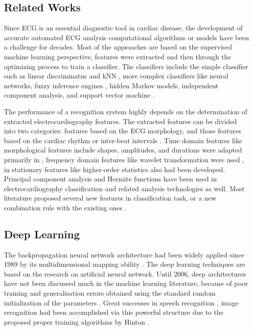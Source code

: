 \documentclass[journal]{IEEEtran}
\begin{document}
\subsection{Related Works}
Since ECG is an essential diagnostic tool in cardiac disease, the development of accurate automated ECG analysis computational algorithms or models have been a challenge for decades. 
Most of the approaches are based on the supervised machine learning perspective, features were extracted and then through the optimizing process to train a classifier.
The classifiers include the simple classifier such as linear discriminatns \cite{shinwari2012classification} and kNN \cite{homaeinezhad2012ecg}, more complex classifiers like neural networks\cite{jiang2007nn, olmez1997ga, lin2012werable, osowski2001hybrid}, fuzzy inference engines \cite{osowski2001hybrid, kundu1998fuzzy}, hidden Markov models\cite{andreao2006hmm, coast1990hmm}, independent component analysis\cite{zhu2008ica}, and support vector machine \cite{melgan2008svmpso, kampoura2009svm, khandoker2009svm}.

The performance of a recognition system highly depends on the determination of extracted electrocardiography features. 
The extracted features can be divided into two categories: features based on the ECG morphology, and those features based on the cardiac rhythm or inter-beat intervals \cite{oster2015semiSKF}. 
Time domain features like morphological features include shapes, amplitudes, and durations were adapted primarily in \cite{jekova2008assessment, christove2006morph, can2012morph}, frequency domain features like wavelet transformation were used \cite{inan2006wavelet, banerjee2014wavelet}, in \cite{Übeyli2009} stationary features like higher-order statistics also had been developed. Principal component analysis \cite{stam1998pca} and Hermite functions \cite{lager2000} have been used in electrocardiography classification and related analysis technologies as well. 
Most literature proposed several new features in classification task, or a new combination rule with the existing ones \cite{mar2011}.

\subsection{Deep Learning}

The backpropagation neural network architecture had been widely applied since 1989 by its multidimensional mapping ability \cite{hecht1989bp}. 
The deep learning techniques are based on the research on artificial neural network. 
Until 2006, deep architectures have not been discussed much in the machine learning literature, because of poor training and generalisation errors obtained using the standard random initialization of the parameters \cite{bengio2009daai}. 
Great successes in speech recognition \cite{hinton2012deep}, image recognition \cite{ciresan2010deep} had been accomplished via this powerful structure due to the proposed proper training algorithms by Hinton \cite{hinton2006dimen}. 
\end{document}

